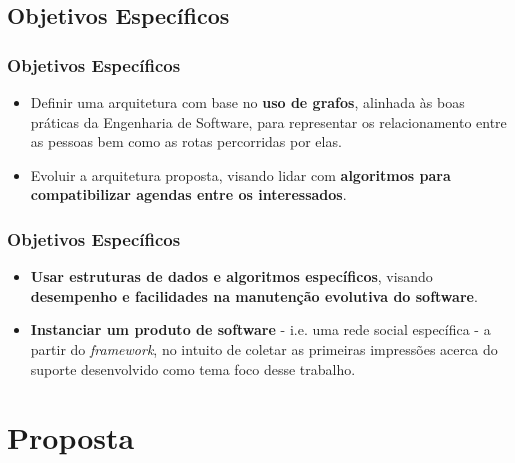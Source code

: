 \documentclass{beamer}
\begin{document}
\subsection{Objetivos Específicos}

\begin{frame}
\frametitle{Objetivos Específicos}

\begin{itemize}
	\item Definir uma arquitetura com base no \textbf{uso de grafos}, alinhada às boas práticas da Engenharia de Software, para representar os relacionamento entre as pessoas bem como as rotas percorridas por elas.
	\item Evoluir a arquitetura proposta, visando lidar com \textbf{algoritmos para compatibilizar agendas entre os interessados}.
\end{itemize}

\end{frame}

\begin{frame}
\frametitle{Objetivos Específicos}

\begin{itemize}
	\item \textbf{Usar estruturas de dados e algoritmos específicos}, visando \textbf{desempenho e facilidades na manutenção evolutiva do software}.
	\item \textbf{Instanciar um produto de software} - i.e. uma rede social específica - a partir do \textit{framework}, no intuito de coletar as primeiras impressões acerca do suporte desenvolvido como tema foco desse trabalho.
\end{itemize}

\end{frame}

\section{Proposta}
\end{document}
